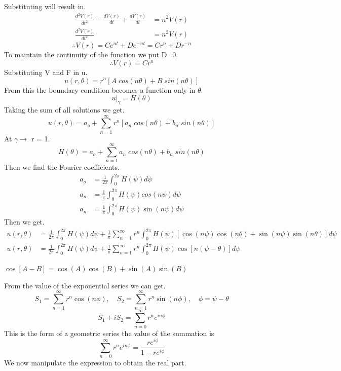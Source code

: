 \documentclass[]{article}
\begin{document}
Substituting will result in.
\begin{align*}
\frac{d^2V(r)}{dt^2}-\frac{dV(r)}{dt}+\frac{dV(r)}{dt}&=n^2V(r)
\\
\frac{d^2V(r)}{dt^2} &= n^2V(r)
\end{align*}
\[
\therefore V(r) = Ce^{nt}+De^{-nt} = Cr^n+Dr^{-n}    
\]
To maintain the continuity of the function we put D=0.
\[
\therefore V(r) = Cr^n
\]
Substituting V and F in u.
\begin{equation}
u(r,\theta) = r^n[A\;cos(n\theta)+B\;sin(n\theta)]
\end{equation}
From this the boundary condition becomes a function only in $\theta$.
\begin{equation}
u|_\gamma = H(\theta)
\end{equation}
Taking the sum of all solutions we get.
\[
    u(r,\theta) = a_o + \sum_{n=1}^{\infty} r^n[a_n\;cos(n\theta)+b_n\;sin(n\theta)]    
\]
At $\gamma \longrightarrow $ r = 1.
\[
    H(\theta) = a_o + \sum_{n=1}^{\infty} a_n\;cos(n\theta)+b_n\;sin(n\theta) 
\]
Then we find the Fourier coefficients.
\begin{align*}
a_o &= \frac{1}{2\pi}\int_{0}^{2\pi} H(\psi ) d\psi 
\\
a_n &=\frac{1}{\pi}\int_{0}^{2\pi} H(\psi ) cos(n\psi ) d\psi 
\\
a_n &=\frac{1}{\pi}\int_{0}^{2\pi} H(\psi ) \sin(n\psi ) d\psi 
\end{align*}
Then we get.
\begin{align*}
u(r,\theta) &= \frac{1}{2\pi}\int_{0}^{2\pi} H(\psi ) d\psi  + \frac{1}{\pi}\sum_{n=1}^{\infty} r^n \int_{0}^{2\pi} H(\psi )[\cos(n\psi )\cos(n\theta) + \sin(n\psi )\sin(n\theta)]d\psi 
\\
u(r,\theta) &= \frac{1}{2\pi}\int_{0}^{2\pi} H(\psi ) d\psi  + \frac{1}{\pi}\sum_{n=1}^{\infty}r^n\int_{0}^{2\pi} H(\psi )\cos[n(\psi  - \theta)]d\psi 
\end{align*}
\begin{enrichment*}{}
    $\cos[A-B] = \cos(A)\cos(B) + \sin(A)\sin(B)$
\end{enrichment*}
From the value of the exponential series we can get.
\[
    S_1 = \sum_{n=1}^{\infty} r^n \cos(n\phi),\quad S_2 =\sum_{n=1}^{\infty}r^n \sin(n\phi), \quad \phi = \psi  - \theta    
\]
\[
    S_1 + i S_2 = \sum_{n=0}^{\infty} r^n e^{in\phi}    
\]
This is the form of a geometric series the value of the summation is
\[
    \sum_{n=0}^{\infty} r^n e^{in\phi} = \frac{r e^{i\phi}}{1- r e^{i\phi}}
\]
We now manipulate the expression to obtain the real part.
\end{document}
